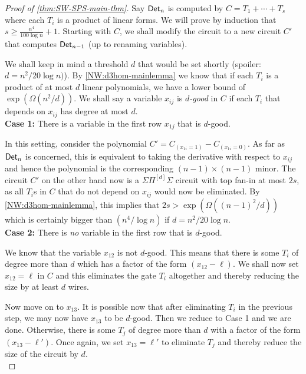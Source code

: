 \begin{proof}[Proof of \autoref{thm:SW-SPS-main-thm}]
 Say $\operatorname{\mathsf{Det}}_n$ is computed by $C = T_1 + \cdots + T_s$ where each $T_i$ is a product of linear forms.
We will prove by induction that $s\geq \frac{n^4}{100\log n} + 1$. Starting with $C$, we shall modify the circuit to a new circuit $C'$ that computes $\operatorname{\mathsf{Det}}_{n-1}$ (up to renaming variables). 

We shall keep in mind a threshold $d$ that would be set shortly (spoiler: $d= n^2/20\log n)$).
By \autoref{NW:d3hom-mainlemma} we know that if each $T_i$ is a product of at most $d$ linear polynomials, we have a lower bound of $\exp(\Omega(n^2/d))$. We shall say a variable $x_{ij}$ is \emph{$d$-good} in $C$ if each $T_i$ that depends on $x_{ij}$ has degree at most $d$. \\

{\bf Case 1:} There is a variable in the first row $x_{1j}$ that is $d$-good. 

\medskip

\noindent 
In this setting, consider the polynomial $C' = C_{(x_{1i} = 1)} - C_{(x_{1i} = 0)}$.
As far as $\operatorname{\mathsf{Det}}_n$ is concerned, this is equivalent to taking the derivative with respect to $x_{ij}$ and hence the polynomial is the corresponding $(n-1)\times (n-1)$ minor.
The circuit $C'$ on the other hand now is a $\Sigma\Pi^{[d]}\Sigma$ circuit with top fan-in at most $2s$, as all $T_i$s in $C$ that do not depend on $x_{ij}$ would now be eliminated.
By \autoref{NW:d3hom-mainlemma}, this implies that $2s > \exp(\Omega((n-1)^2/d))$ which is certainly bigger than $(n^4 / \log n)$ if $d = n^2/20\log n$.\\

{\bf Case 2:} There is \emph{no} variable in the first row that is $d$-good. 

\medskip

\noindent 
We know that the variable $x_{12}$ is not $d$-good.
This means that there is some $T_i$ of degree more than $d$ which has a factor of the form $(x_{12} - \ell)$.
We shall now set $x_{12} = \ell$ in $C$ and this eliminates the gate $T_i$ altogether and thereby reducing the size by at least $d$ wires. 

Now move on to $x_{13}$. It is possible now that after eliminating $T_i$ in the previous step, we may now have $x_{13}$ to be $d$-good. Then we reduce to Case 1 and we are done. Otherwise, there is some $T_j$ of degree more than $d$ with a factor of the form $(x_{13} - \ell')$. Once again, we set $x_{13} = \ell'$ to eliminate $T_j$ and thereby reduce the size of the circuit by $d$. \\


\end{proof}
